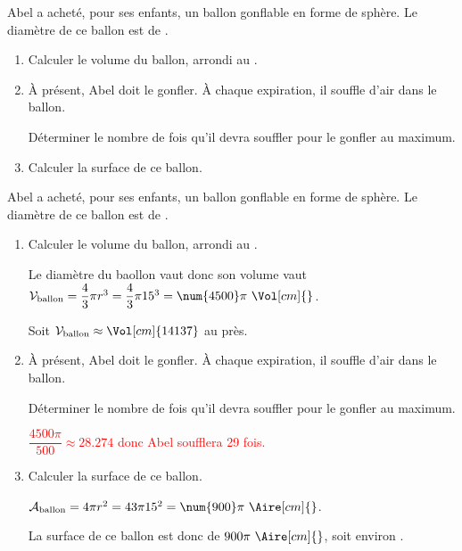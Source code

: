 \begin{exercice*}
    Abel a acheté, pour ses enfants, un ballon gonflable en forme de sphère. Le diamètre de ce ballon est de .
    \begin{enumerate}
        \item Calculer le volume du ballon, arrondi au \Vol[cm]{}.
        \item À présent, Abel doit le gonfler. À chaque expiration, il souffle  d'air dans le ballon.
        
        Déterminer le nombre de fois qu'il devra souffler pour le gonfler au maximum.
        \item Calculer la surface de ce ballon.
    \end{enumerate}
\end{exercice*}
\begin{corrige}
    Abel a acheté, pour ses enfants, un ballon gonflable en forme de sphère. Le diamètre de ce ballon est de .

    \begin{enumerate}
        \item Calculer le volume du ballon, arrondi au \Vol[cm]{}.
        
        {\color{red} Le diamètre du baollon vaut  donc son volume vaut $\mathcal{V}_{\text{ballon}}=\dfrac43\pi r^3=\dfrac43\pi 15^3=\num{4500}\pi~\Vol[cm]{}$.
        
        Soit $\mathcal{V}_{\text{ballon}}\approx\Vol[cm]{14137}$ au \Vol[cm]{} près.}
        \item À présent, Abel doit le gonfler. À chaque expiration, il souffle  d'air dans le ballon.
        
        Déterminer le nombre de fois qu'il devra souffler pour le gonfler au maximum.

        \textcolor{red}{$\dfrac{\num{4500}\pi}{500}\approx\num{28.274}$ donc Abel soufflera 29 fois.}
        \item Calculer la surface de ce ballon.
        
        {\color{red} $\mathcal{A}_{\text{ballon}}=4\pi r^2=43\pi 15^2=\num{900}\pi~\Aire[cm]{}$.
        
        La surface de ce ballon est donc de $900\pi~\Aire[cm]{}$, soit environ .
        }
    \end{enumerate}
\end{corrige}
